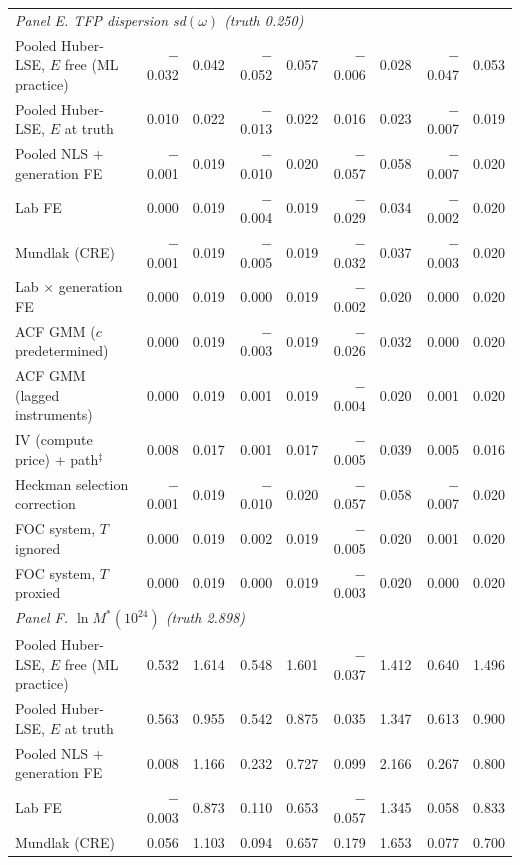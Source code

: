 \begin{table}[!htbp]
\begin{threeparttable}
\begin{tabular}{lrrrrrrrr}
\midrule
\multicolumn{9}{l}{\textit{Panel E. TFP dispersion sd$(\omega)$ (truth 0.250)}} \\
Pooled Huber-LSE, $E$ free (ML practice) & $-$0.032 & 0.042 & $-$0.052 & 0.057 & $-$0.006 & 0.028 & $-$0.047 & 0.053 \\
Pooled Huber-LSE, $E$ at truth & 0.010 & 0.022 & $-$0.013 & 0.022 & 0.016 & 0.023 & $-$0.007 & 0.019 \\
Pooled NLS + generation FE & $-$0.001 & 0.019 & $-$0.010 & 0.020 & $-$0.057 & 0.058 & $-$0.007 & 0.020 \\
Lab FE & 0.000 & 0.019 & $-$0.004 & 0.019 & $-$0.029 & 0.034 & $-$0.002 & 0.020 \\
Mundlak (CRE) & $-$0.001 & 0.019 & $-$0.005 & 0.019 & $-$0.032 & 0.037 & $-$0.003 & 0.020 \\
Lab $\times$ generation FE & 0.000 & 0.019 & 0.000 & 0.019 & $-$0.002 & 0.020 & 0.000 & 0.020 \\
ACF GMM ($c$ predetermined) & 0.000 & 0.019 & $-$0.003 & 0.019 & $-$0.026 & 0.032 & 0.000 & 0.020 \\
ACF GMM (lagged instruments) & 0.000 & 0.019 & 0.001 & 0.019 & $-$0.004 & 0.020 & 0.001 & 0.020 \\
IV (compute price) + path$^{\ddagger}$ & 0.008 & 0.017 & 0.001 & 0.017 & $-$0.005 & 0.039 & 0.005 & 0.016 \\
Heckman selection correction & $-$0.001 & 0.019 & $-$0.010 & 0.020 & $-$0.057 & 0.058 & $-$0.007 & 0.020 \\
FOC system, $T$ ignored & 0.000 & 0.019 & 0.002 & 0.019 & $-$0.005 & 0.020 & 0.001 & 0.020 \\
FOC system, $T$ proxied & 0.000 & 0.019 & 0.000 & 0.019 & $-$0.003 & 0.020 & 0.000 & 0.020 \\
\midrule
\multicolumn{9}{l}{\textit{Panel F. $\ln M^*(10^{24})$ (truth 2.898)}} \\
Pooled Huber-LSE, $E$ free (ML practice) & 0.532 & 1.614 & 0.548 & 1.601 & $-$0.037 & 1.412 & 0.640 & 1.496 \\
Pooled Huber-LSE, $E$ at truth & 0.563 & 0.955 & 0.542 & 0.875 & 0.035 & 1.347 & 0.613 & 0.900 \\
Pooled NLS + generation FE & 0.008 & 1.166 & 0.232 & 0.727 & 0.099 & 2.166 & 0.267 & 0.800 \\
Lab FE & $-$0.003 & 0.873 & 0.110 & 0.653 & $-$0.057 & 1.345 & 0.058 & 0.833 \\
Mundlak (CRE) & 0.056 & 1.103 & 0.094 & 0.657 & 0.179 & 1.653 & 0.077 & 0.700 \\

\end{tabular}
\end{threeparttable}
\end{table}
